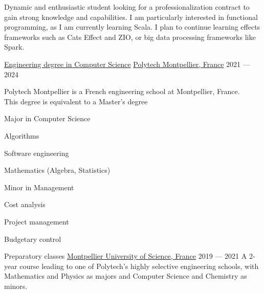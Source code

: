 \begin{MainPart}

  \color{Black}
  \vspace{0.25cm}
  {
    \begin{flushleft}
      Dynamic and enthusiastic student looking for a professionalization contract to gain strong knowledge and capabilities. I am particularly interested in functional programming, as I am currently learning Scala. I plan to continue learning effects frameworks such as Cats Effect and ZIO, or big data processing frameworks like Spark.
    \end{flushleft}
  }
  \Experience%
  {\ColorHighlight}
  {\href{https://www.polytech.umontpellier.fr/images/ecole/Plaquettes/SPECIALITE_IG_2018_EN.pdf}{Engineering degree in Computer Science}}
  {\href{https://english.polytech.umontpellier.fr/}{Polytech Montpellier, France}}
  {2021 --- 2024}
  {
    Polytech Montpellier is a French engineering school at Montpellier, France.\\
    This degree is equivalent to a Master's degree

    \begin{multicols}{2}
      Major in Computer Science
      \begin{ItemList}{\ColorHighlight}
        \item [\ding{226}] Algorithms
        \item [\ding{226}] Software engineering
        \item [\ding{226}] Mathematics (Algebra, Statistics)
      \end{ItemList}
      \columnbreak%
      Minor in Management
      \begin{ItemList}{\ColorHighlight}
        \item [\ding{226}] Cost analysis
        \item [\ding{226}] Project management
        \item [\ding{226}] Budgetary control
      \end{ItemList}
    \end{multicols}
  }
  \Experience%
  {\ColorHighlight}
  {Preparatory classes}
  {\href{https://www.umontpellier.fr/en/}{Montpellier University of Science, France}}
  {2019 --- 2021}
  {
    A 2-year course leading to one of Polytech's highly selective engineering schools, with Mathematics and Physics as majors and Computer Science and Chemistry as minors.
  }


\end{MainPart}
